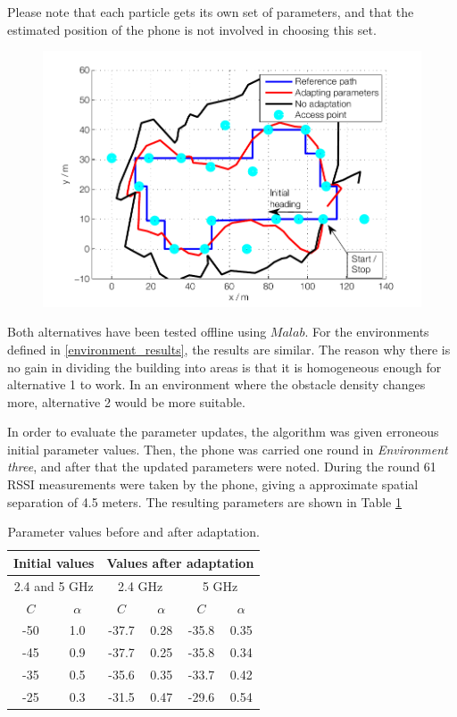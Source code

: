 \documentclass{LTHthesis}
\begin{document}
Please note that each particle gets its own set of parameters, and that the estimated position of the phone is not involved in choosing this set.
%
\begin{figure}[!hbt]

\includegraphics[width=1\textwidth ]{images/adapt_parameters/adaptation_vs_none}
\caption{}
\label{adaptation_vs_none}
\end{figure}
%
Both alternatives have been tested offline using $Malab$. For the environments defined in \ref{environment_results}, the results are similar. The reason why there is no gain in dividing the building into areas is that it is homogeneous enough for alternative 1 to work. In an environment where the obstacle density changes more, alternative 2 would be more suitable.

In order to evaluate the parameter updates, the algorithm was given erroneous initial parameter values. Then, the phone was carried one round in \emph{Environment three}, and after that the updated parameters were noted. During the round 61 RSSI measurements were taken by the phone, giving a approximate spatial separation of 4.5 meters. The resulting parameters are shown in Table \ref{table:parameter_adaptation}

\begin{table}[!hbt]
\begin{center}
\begin{tabular}{|c|c|c|c|c|c|}
\hline
\multicolumn{2}{|c|}{Initial values}
&\multicolumn{4}{|c|}{Values after adaptation} \\
\hline
\hline
\multicolumn{2}{|c|}{2.4 and 5 GHz}
&\multicolumn{2}{|c|}{2.4 GHz}
&\multicolumn{2}{|c|}{5 GHz} \\

\hline
$C$ & $\alpha$ & $C$ & $\alpha$& $C$& $\alpha$\\
\hline
-50 & 1.0 & -37.7 & 0.28 & -35.8 & 0.35\\
\hline
-45 & 0.9 & -37.7 & 0.25 & -35.8 & 0.34\\
\hline
-35 & 0.5 & -35.6 & 0.35 & -33.7 & 0.42\\
\hline
-25 & 0.3 & -31.5 & 0.47 & -29.6 & 0.54\\
\hline
\end{tabular}
\end{center}
\caption{Parameter values before and after adaptation.}\label{table:parameter_adaptation}
\end{table}
\end{document}
